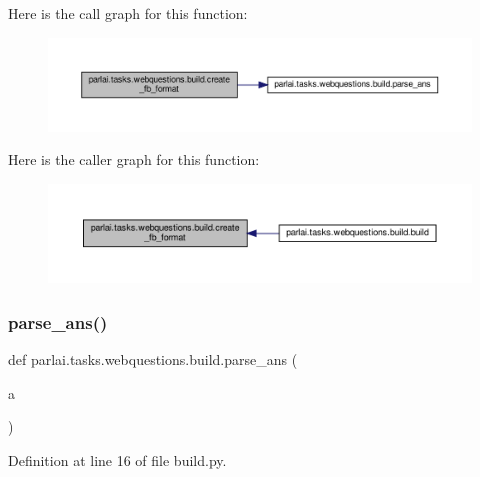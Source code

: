 Here is the call graph for this function\+:
\nopagebreak
\begin{figure}[H]
\begin{center}
\leavevmode
\includegraphics[width=350pt]{namespaceparlai_1_1tasks_1_1webquestions_1_1build_aba751402cc3a79acbe7517832498a7e6_cgraph}
\end{center}
\end{figure}
Here is the caller graph for this function\+:
\nopagebreak
\begin{figure}[H]
\begin{center}
\leavevmode
\includegraphics[width=350pt]{namespaceparlai_1_1tasks_1_1webquestions_1_1build_aba751402cc3a79acbe7517832498a7e6_icgraph}
\end{center}
\end{figure}
\mbox{\label{namespaceparlai_1_1tasks_1_1webquestions_1_1build_a969c68eeef096e477def172c88928eb3}} 
\subsubsection{\texorpdfstring{parse\+\_\+ans()}{parse\_ans()}}
{\footnotesize\ttfamily def parlai.\+tasks.\+webquestions.\+build.\+parse\+\_\+ans (\begin{DoxyParamCaption}\item[{}]{a }\end{DoxyParamCaption})}



Definition at line 16 of file build.\+py.



